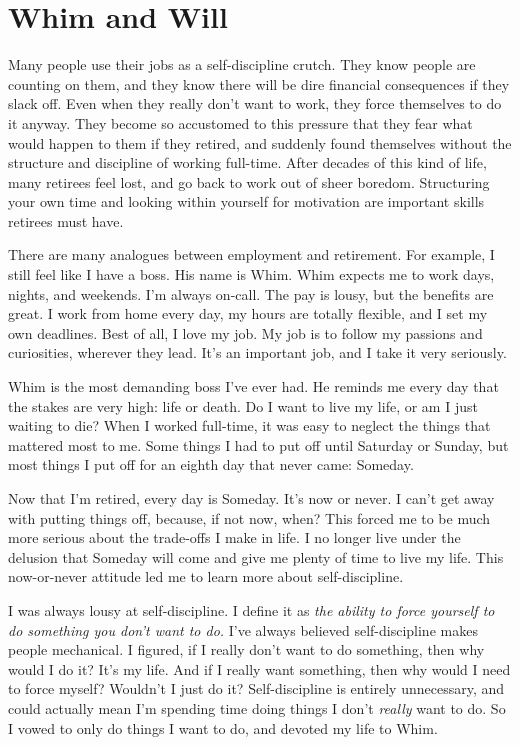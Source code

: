 \section{Whim and Will}
Many people use their jobs as a self-discipline crutch. They know people are counting on them, and they know there will be dire financial consequences if they slack off. Even when they really don't want to work, they force themselves to do it anyway. They become so accustomed to this pressure that they fear what would happen to them if they retired, and suddenly found themselves without the structure and discipline of working full-time. After decades of this kind of life, many retirees feel lost, and go back to work out of sheer boredom. Structuring your own time and looking within yourself for motivation are important skills retirees must have.

There are many analogues between employment and retirement. For example, I still feel like I have a boss. His name is Whim. Whim expects me to work days, nights, and weekends. I'm always on-call. The pay is lousy, but the benefits are great. I work from home every day, my hours are totally flexible, and I set my own deadlines. Best of all, I love my job. My job is to follow my passions and curiosities, wherever they lead. It's an important job, and I take it very seriously.

Whim is the most demanding boss I've ever had. He reminds me every day that the stakes are very high: life or death. Do I want to live my life, or am I just waiting to die? When I worked full-time, it was easy to neglect the things that mattered most to me. Some things I had to put off until Saturday or Sunday, but most things I put off for an eighth day that never came: Someday.

Now that I'm retired, every day is Someday. It's now or never. I can't get away with putting things off, because, if not now, when? This forced me to be much more serious about the trade-offs I make in life. I no longer live under the delusion that Someday will come and give me plenty of time to live my life. This now-or-never attitude led me to learn more about self-discipline.

I was always lousy at self-discipline. I define it as \emph{the ability to force yourself to do something you don't want to do.} I've always believed self-discipline makes people mechanical. I figured, if I really don't want to do something, then why would I do it? It's my life. And if I really want something, then why would I need to force myself? Wouldn't I just do it? Self-discipline is entirely unnecessary, and could actually mean I'm spending time doing things I don't \emph{really} want to do. So I vowed to only do things I want to do, and devoted my life to Whim.

